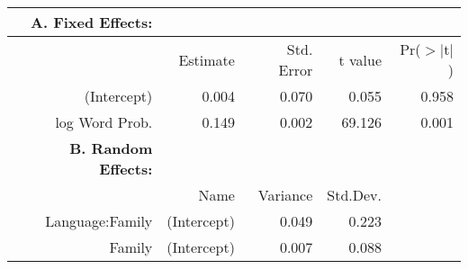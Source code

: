 \begin{tabular}{rrrrr}
 {\bf A. Fixed Effects:} \\
\hline
 & Estimate & Std. Error & t value & Pr($>$$|$t$|$) \\ 
  \hline
(Intercept) & 0.004 & 0.070 & 0.055 & 0.958 \\ 
  log Word Prob. & 0.149 & 0.002 & 69.126 & 0.001 \\ 

\hline \hline
{\bf B. Random Effects:} \\
\hline
& Name & Variance & Std.Dev. \\
\hline
Language:Family & (Intercept) & 0.049 & 0.223 \\
Family & (Intercept) & 0.007 & 0.088 \\
\end{tabular}
